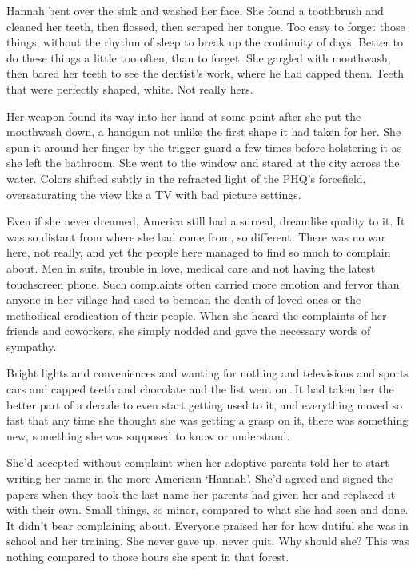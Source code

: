 Hannah bent over the sink and washed her face.  She found a toothbrush and cleaned her teeth, then flossed, then scraped her tongue.  Too easy to forget those things, without the rhythm of sleep to break up the continuity of days.  Better to do these things a little too often, than to forget.  She gargled with mouthwash, then bared her teeth to see the dentist's work, where he had capped them.  Teeth that were perfectly shaped, white.  Not really hers.



Her weapon found its way into her hand at some point after she put the mouthwash down, a handgun not unlike the first shape it had taken for her.  She spun it around her finger by the trigger guard a few times before holstering it as she left the bathroom.  She went to the window and stared at the city across the water.  Colors shifted subtly in the refracted light of the PHQ's forcefield, oversaturating the view like a TV with bad picture settings.



Even if she never dreamed, America still had a surreal, dreamlike quality to it.  It was so distant from where she had come from, so different.  There was no war here, not really, and yet the people here managed to find so much to  complain about.  Men in suits, trouble in love, medical care and not having the latest touchscreen phone.  Such complaints often carried more emotion and fervor than anyone in her village had used to bemoan the death of loved ones or the methodical eradication of their people.  When she heard the complaints of her friends and coworkers, she simply nodded and gave the necessary words of sympathy.



Bright lights and conveniences and wanting for nothing and televisions and sports cars and capped teeth and chocolate and the list went on\ldots  It had taken her the better part of a decade to even start getting used to it, and everything moved so fast that any time she thought she was getting a grasp on it, there was something new, something she was supposed to know or understand.



She'd accepted without complaint when her adoptive parents told her to start writing her name in the more American `Hannah'.  She'd agreed and signed the papers when they took the last name her parents had given her and replaced it with their own. Small things, so minor, compared to what she had seen and done.  It didn't bear complaining about.  Everyone praised her for how dutiful she was in school and her training.  She never gave up, never quit.  Why should she?  This was nothing compared to those hours she spent in that forest.



